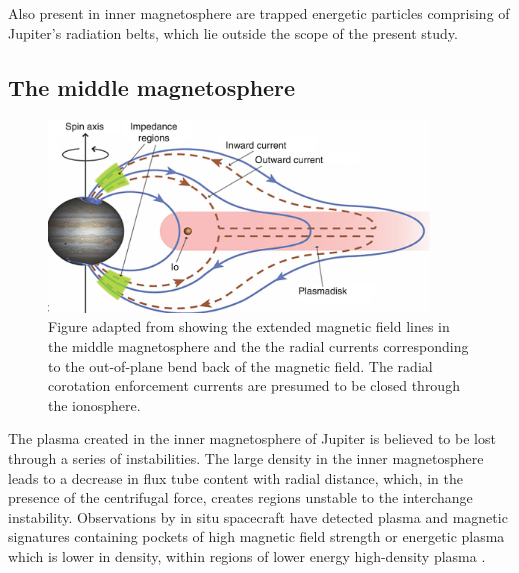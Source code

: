 Also present in inner magnetosphere are trapped energetic particles comprising of Jupiter's radiation belts, which lie outside the scope of the present study. 

\subsection{The middle magnetosphere}

\begin{figure}
    \centering
    \includegraphics[width=0.9\textwidth]{images1/corotation-schematic.png}
    \caption{Figure adapted from \protect{} showing the extended magnetic field lines in the middle magnetosphere and the the radial currents corresponding to the out-of-plane bend back of the magnetic field. The radial corotation enforcement currents are presumed to be closed through the ionosphere.}
    \label{fig:corotation-schematic}
\end{figure}

The plasma created in the inner magnetosphere of Jupiter is believed to be lost through a series of instabilities. The large density in the inner magnetosphere leads to a decrease in flux tube content with radial distance, which, in the presence of the centrifugal force, creates regions unstable to the interchange instability. Observations by in situ spacecraft have detected plasma and magnetic signatures containing pockets of high magnetic field strength or energetic plasma which is lower in density, within regions of lower energy high-density plasma \cite{Thorne1997GalileoTorus,Kivelson1997IntermittentInterchange}. 

